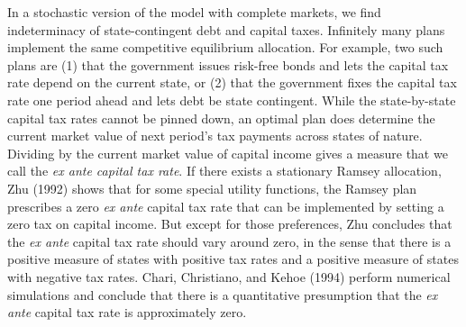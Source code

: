 In a stochastic version of the model with complete markets, we find
indeterminacy of state-contingent debt and capital taxes.
Infinitely many plans implement the same
competitive equilibrium allocation. For example,
two such plans are  (1) that the government issues risk-free
bonds and lets the capital tax rate depend on the current state,
or (2) that the government  fixes the capital tax rate one period ahead and lets
debt be state contingent. While the state-by-state capital tax
rates cannot be pinned down, an optimal plan
does determine the current market value of next period's
tax payments across states of nature. Dividing
by the current market value of capital income gives
a measure that we call the {\it ex ante capital tax rate}.
If there exists a stationary Ramsey allocation, Zhu (1992)
shows that for some special
utility functions, the Ramsey plan prescribes a zero {\it ex ante\/} capital
tax rate that can be implemented by setting a zero tax on capital
income. But except for those   preferences, Zhu concludes
that the {\it ex ante\/} capital tax rate should vary around zero, in the
sense that there is a positive measure of states with positive tax
rates and a positive measure of states with negative tax rates.  Chari,
Christiano, and Kehoe (1994)
perform numerical simulations and conclude that
there is a quantitative presumption that the {\it ex ante\/} capital tax rate is
approximately zero.
%
%
%
%
%
%

